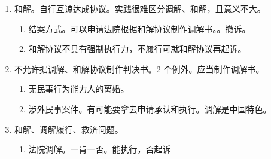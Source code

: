 \begin{enumerate}
\begin{enumerate}
\begin{enumerate}
                \end{enumerate}
          \item 效力。
                \begin{enumerate}
                  \item {}。（有给付内容的）可以申请强制执行。。
                  \item 需要担责的，调解书签收后生效。
                \end{enumerate}
          \item {}不签收不影响调解书的效力/生效。担保时，调解书对担保人产生约束。
          \item 错误处理。
                \begin{enumerate}
                  \item 调解书和调解协议内容不一致，重新补正即可。。
                  \item 确有错误 \yjt 再审。。
                        不要拿民法上的合同类推。撤销一份生效的法律文书只有三撤和再审！！
                        。
                \end{enumerate}
          \item {}。
        \end{enumerate}
  \item 和解。自行互谅达成协议。实践很难区分调解、和解，且意义不大。
        \begin{enumerate}
          \item 结案方式。\yi 可以申请法院根据和解协议制作调解书。。\er 撤诉。
          \item 和解协议不具有强制执行力，不履行可就和解协议再起诉。
        \end{enumerate}
  \item 不允许据调解、和解协议制作判决书。2 个例外。应当制作调解书。
        \begin{enumerate}
          \item 无民事行为能力人的离婚。
          \item 涉外民事案件。有可能要拿去申请承认和执行。调解是中国特色。
        \end{enumerate}
  \item 和解、调解履行、救济问题。
        \begin{enumerate}
          \item 法院调解。一肯一否。能执行，否起诉

\end{enumerate}
\end{enumerate}
